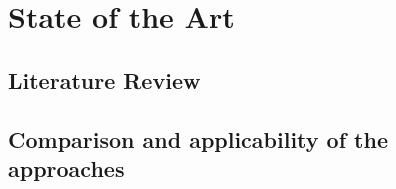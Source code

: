 \chapter{State of the Art}
\label{ch:StateOfTheArt}

\section{Literature Review}
\label{sec:StateOfTheArt:LiteratureReview}

\section{Comparison and applicability of the approaches}
\label{sec:StateOfTheArt:ComparisonAndApplicability}